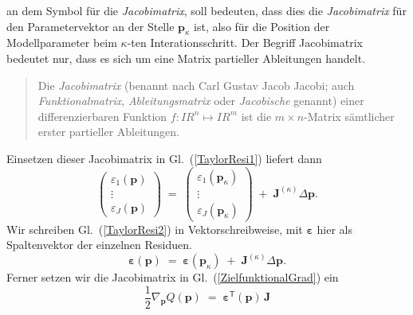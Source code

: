 an dem Symbol für die \textsl{Jacobimatrix}, soll bedeuten,
dass dies die \textsl{Jacobimatrix} für den Parametervektor an der Stelle
$\mathbf{p}_\kappa$ ist, also für die Position der Modellparameter beim $\kappa$-ten Interationsschritt.
Der Begriff Jacobimatrix bedeutet nur, dass es
sich um eine Matrix partieller Ableitungen handelt.
\begin{quote}
Die \textsl{Jacobimatrix} (benannt nach Carl Gustav Jacob Jacobi; auch
\textsl{Funktionalmatrix}, \textsl{Ableitungsmatrix} oder \textsl{Jacobische} genannt)
einer differenzierbaren Funktion
$f\colon I \! \! R^{n} \mapsto I \! \! R ^{m}$ ist die
$m\times n$-Matrix sämtlicher erster partieller Ableitungen.
\end{quote}


Einsetzen dieser Jacobimatrix in Gl.~(\ref{TaylorResi1}) liefert dann
\begin{equation}
\left(\begin{array}{c}
\varepsilon_1(\mathbf{p}) \\
\vdots \\
\varepsilon_J(\mathbf{p})
\end{array}\right)
\; = \;
\left(\begin{array}{c}
\varepsilon_1(\mathbf{p}_\kappa) \\
\vdots \\
\varepsilon_J(\mathbf{p}_\kappa)
\end{array}\right)
\; + \; \boldsymbol{J}^{(\kappa)} \Delta \mathbf{p} .
\label{TaylorResi2}
\end{equation}
Wir schreiben Gl.~(\ref{TaylorResi2}) in Vektorschreibweise, mit $\boldsymbol{\varepsilon}$ hier als Spaltenvektor
der einzelnen Residuen.
\begin{equation}
\boldsymbol{\varepsilon}(\mathbf{p})
\; = \;
\boldsymbol{\varepsilon}(\mathbf{p}_\kappa)
\; + \; \boldsymbol{J}^{(\kappa)} \Delta \mathbf{p} .
\label{TaylorResi3}
\end{equation}
Ferner setzen wir die Jacobimatrix in Gl.~(\ref{ZielfunktionalGrad}) ein
\begin{equation}
\frac{1}{2} \nabla_{\mathbf{p}} Q(\mathbf{p})  \; = \; \boldsymbol{\varepsilon}^\textsf{T}(\mathbf{p})
 \, \boldsymbol{J}
\label{ZielfunktionalGradJ}
\end{equation}
